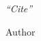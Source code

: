 \thispagestyle{empty}
\vspace*{\fill}\thispagestyle{plain}
\renewcommand{\epigraphrule}{0pt}
\renewcommand{\epigraphflush}{center}
\renewcommand{\epigraphwidth}{11cm}
\epigraph{\itshape ``Cite''}{Author}
\vspace*{\fill}
\renewcommand{\epigraphrule}{0pt}

